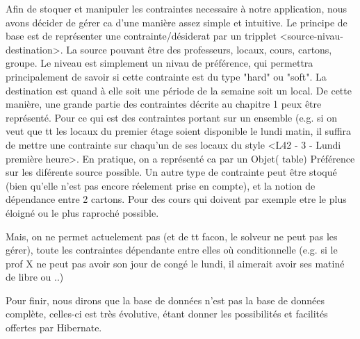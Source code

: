 Afin de stoquer et manipuler les contraintes necessaire à notre application, nous avons décider de gérer ca d'une manière assez simple et intuitive. 
Le principe de base est de représenter une contrainte/désiderat par un tripplet <source-nivau-destination>.  La source pouvant être des professeurs, locaux, cours, cartons, groupe. Le niveau est simplement un nivau de préférence, qui permettra principalement de savoir si cette contrainte est du type "hard" ou "soft".  La destination est quand à elle soit une période de la semaine soit un local.  De cette manière, une grande partie des contraintes décrite au chapitre 1 peux être représenté.  Pour ce qui est des contraintes portant sur un ensemble (e.g. si on veut que tt les locaux du premier étage soient disponible le lundi matin, il suffira de mettre une contrainte sur chaqu'un de ses locaux du style <L42 - 3 - Lundi première heure>.  En pratique, on a représenté ca par un Objet( table) Préférence sur les diférente source possible.
Un autre type de contrainte peut être stoqué (bien qu'elle n'est pas encore réelement prise en compte), et la notion de dépendance entre 2 cartons.  Pour des cours qui doivent par exemple etre le plus éloigné ou le plus raproché possible.

Mais, on ne permet actuelement pas (et de tt facon, le solveur ne peut pas les gérer), toute les contraintes dépendante entre elles où conditionnelle (e.g. si le prof X ne peut pas avoir son jour de congé le lundi, il aimerait avoir ses matiné de libre ou ..)

Pour finir, nous dirons que la base de données n'est pas la base de données complète, celles-ci est très évolutive, étant donner les possibilités et facilités offertes par Hibernate.